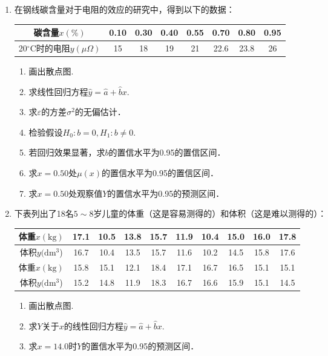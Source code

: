 \documentclass[10pt,a4paper]{article}
\begin{document}
\begin{enumerate}
    \item 在钢线碳含量对于电阻的效应的研究中，得到以下的数据：
    \renewcommand{\arraystretch}{1.3}
    \begin{table}[H]\centering
        \begin{tabular}{c|ccccccc}
        \hline
        碳含量$x(\%)$  & 0.10 & 0.30 & 0.40 & 0.55 & 0.70 & 0.80 & 0.95 \\ \hline
        20$^{\circ}$C时的电阻$y(\mu\Omega)$ & 15   & 18   & 19   & 21   & 22.6 & 23.8 & 26   \\ \hline
        \end{tabular}
    \end{table}
    \renewcommand{\arraystretch}{1.0}
    \begin{enumerate}
        \item 画出散点图.
        \item 求线性回归方程$\hat{y}=\hat{a}+\hat{b}x$.
        \item 求$\varepsilon$的方差$\sigma^2$的无偏估计．
        \item 检验假设$H_0:b=0,H_1:b\neq 0$.
        \item 若回归效果显著，求$b$的置信水平为0.95的置信区间．
        \item 求$x=0.50$处$\mu(x)$的置信水平为0.95的置信区间．
        \item 求$x=0.50$处观察值$Y$的置信水平为0.95的预测区间．
    \end{enumerate}


    \item 下表列出了18名$5\sim 8$岁儿童的体重（这是容易测得的）和体积（这是难以测得的）：
    \renewcommand{\arraystretch}{1.3}
    \begin{table}[H]\centering
        \begin{tabular}{c|ccccccccc}
        \hline
        体重$x(\mathrm{kg})$            & 17.1 & 10.5 & 13.8 & 15.7 & 11.9 & 10.4 & 15.0 & 16.0 & 17.8 \\ \hline
        体积$y(\mathrm{dm^3}$) & 16.7 & 10.4 & 13.5 & 15.7 & 11.6 & 10.2 & 14.5 & 15.8 & 17.6 \\ \hline
        体重$x(\mathrm{kg})$           & 15.8 & 15.1 & 12.1 & 18.4 & 17.1 & 16.7 & 16.5 & 15.1 & 15.1 \\ \hline
        体积$y(\mathrm{dm^3}$) & 15.2 & 14.8 & 11.9 & 18.3 & 16.7 & 16.6 & 15.9 & 15.1 & 14.5 \\ \hline
        \end{tabular}
    \end{table}
    \renewcommand{\arraystretch}{1.0}
    \begin{enumerate}
        \item 画出散点图.
        \item 求$Y$关于$x$的线性回归方程$\hat{y}=\hat{a}+\hat{b}x$.
        \item 求$x=14.0$时$Y$的置信水平为0.95的预测区间．
    \end{enumerate}






\end{enumerate}
\end{document}
